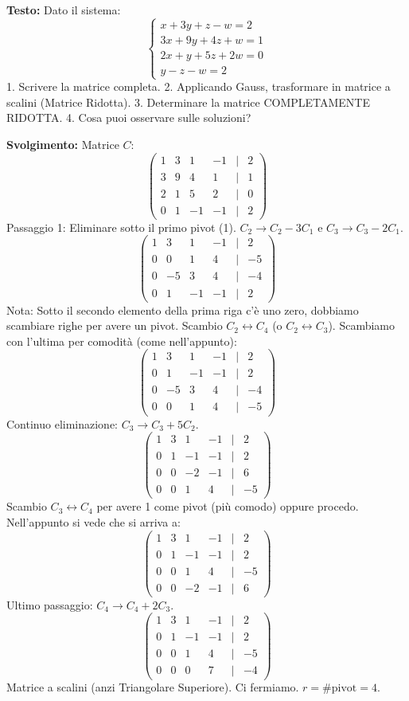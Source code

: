 \textbf{Testo:}
Dato il sistema:
\[
\begin{cases}
x + 3y + z - w = 2 \\
3x + 9y + 4z + w = 1 \\
2x + y + 5z + 2w = 0 \\
y - z - w = 2
\end{cases}
\]
1. Scrivere la matrice completa.
2. Applicando Gauss, trasformare in matrice a scalini (Matrice Ridotta).
3. Determinare la matrice COMPLETAMENTE RIDOTTA.
4. Cosa puoi osservare sulle soluzioni?

\textbf{Svolgimento:}
Matrice $C$:
\[
\begin{pmatrix}
1 & 3 & 1 & -1 & | & 2 \\
3 & 9 & 4 & 1 & | & 1 \\
2 & 1 & 5 & 2 & | & 0 \\
0 & 1 & -1 & -1 & | & 2
\end{pmatrix}
\]
Passaggio 1: Eliminare sotto il primo pivot (1).
$C_2 \to C_2 - 3C_1$ e $C_3 \to C_3 - 2C_1$.
\[
\begin{pmatrix}
1 & 3 & 1 & -1 & | & 2 \\
0 & 0 & 1 & 4 & | & -5 \\
0 & -5 & 3 & 4 & | & -4 \\
0 & 1 & -1 & -1 & | & 2
\end{pmatrix}
\]
Nota: Sotto il secondo elemento della prima riga c'è uno zero, dobbiamo scambiare righe per avere un pivot. Scambio $C_2 \leftrightarrow C_4$ (o $C_2 \leftrightarrow C_3$). Scambiamo con l'ultima per comodità (come nell'appunto):
\[
\begin{pmatrix}
1 & 3 & 1 & -1 & | & 2 \\
0 & 1 & -1 & -1 & | & 2 \\
0 & -5 & 3 & 4 & | & -4 \\
0 & 0 & 1 & 4 & | & -5
\end{pmatrix}
\]
Continuo eliminazione: $C_3 \to C_3 + 5C_2$.
\[
\begin{pmatrix}
1 & 3 & 1 & -1 & | & 2 \\
0 & 1 & -1 & -1 & | & 2 \\
0 & 0 & -2 & -1 & | & 6 \\
0 & 0 & 1 & 4 & | & -5
\end{pmatrix}
\]
Scambio $C_3 \leftrightarrow C_4$ per avere 1 come pivot (più comodo) oppure procedo. Nell'appunto si vede che si arriva a:
\[
\begin{pmatrix}
1 & 3 & 1 & -1 & | & 2 \\
0 & 1 & -1 & -1 & | & 2 \\
0 & 0 & 1 & 4 & | & -5 \\
0 & 0 & -2 & -1 & | & 6
\end{pmatrix}
\]
Ultimo passaggio: $C_4 \to C_4 + 2C_3$.
\[
\begin{pmatrix}
1 & 3 & 1 & -1 & | & 2 \\
0 & 1 & -1 & -1 & | & 2 \\
0 & 0 & 1 & 4 & | & -5 \\
0 & 0 & 0 & 7 & | & -4
\end{pmatrix}
\]
Matrice a scalini (anzi Triangolare Superiore).
Ci fermiamo.
$r = \# \text{pivot} = 4$.

